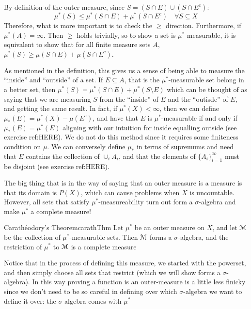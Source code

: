 \documentclass[oneside]{book}
\newcommand{\MM}{\EuScript{M}}
\newcommand{\sse}{\subseteq}
\begin{document}
By definition of the outer measure, since $S = (S\cap E)\cup(S\cap E^c)$:
\[
	\mu^*(S) \le \mu^*(S\cap E) + \mu^*(S\cap E^c) \quad \forall S\sse X
\]
Therefore, what is more important is to check the $\ge$ direction. Furthermore, if $\mu^*(A) = \infty$. Then $\ge$ holds
trivially, so to show a set is $\mu^*$ measurable, it is equivalent to show that for all finite measure sets $A$,
$\mu^*(S) \ge \mu(S\cap E) + \mu(S\cap E^c)$. 

As mentioned in the definition, this gives us a sense of being able to measure the ``inside'' and ``outside'' of a set.
If $E \sse A$, that is the $\mu^*$-measurable set belong in a better set, then $\mu^*(S) = \mu^*(S\cap E)
+ \mu^*(S\setminus E)$ which can be thought of as saying that we are measuring $S$ from the ``inside'' of $E$ and the
``outisde'' of $E$, and getting the same result. In fact, if $\mu^*(X) < \infty$, then we can define $\mu_*(E) = \mu^*(X)
- \mu(E^c)$, and have that $E$ is $\mu^*$-measurable if and only if $\mu_*(E) = \mu^*(E)$ aligning with our intuition
for inside equalling outside (see exercise ref:HERE). We do not do this method since it requires some finiteness condition on $\mu$. We can
conversely define $\mu_*$ in terms of supremums and need that $E$ contains the collection of $\cup_i A_i$, and that the
elements of $\{A_i\}_{i=1}^\infty$ must be disjoint (see exercise ref:HERE).

The big thing that is in the way of saying that an outer measure is a measure is that its domain is $P(X)$, which can
cause problems when $X$ is uncountable. However, all sets that satisfy  $\mu^*$-measureability turn out form
a $\sigma$-algebra and make $\mu^*$ a complete measure!

\begin{thm}{Carath\'eodory's Theorem}{carathThm}
	Let $\mu^*$ be an outer measure on $X$, and let $\MM$ be the collection of $\mu^*$-measurable sets. Then $\MM$ forms
	a $\sigma$-algebra, and the restriction of $\mu^*$ to $\MM$ is a complete measure 
\end{thm}

Notice that in the process of defining this measure, we started with the powerset, and then simply choose all sets that
restrict (which we will show forms a $\sigma$-algebra). In this way proving a function is an outer-measure is a little
less finicky since we don't need to be so careful in defining over which $\sigma$-algebra we want to define it over: the
$\sigma$-algebra comes with $\mu^*$
\end{document}
